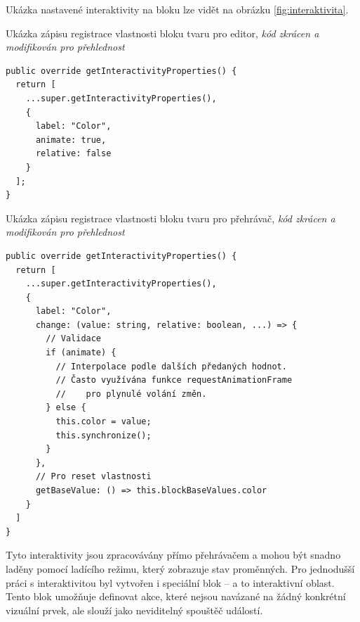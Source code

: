 Ukázka nastavené interaktivity na bloku lze vidět na obrázku \ref{fig:interaktivita}.

\begin{listing}[ht!]
\caption[Ukázka zápisu registrace vlastnosti bloku tvaru pro editor]{Ukázka zápisu registrace vlastnosti bloku tvaru pro editor, \textit{kód zkrácen a modifikován pro přehlednost}}\label{code:zapisVlastnostiEditor}
\begin{verbatim}
public override getInteractivityProperties() {
  return [
    ...super.getInteractivityProperties(),
    {
      label: "Color",
      animate: true,
      relative: false
    }
  ];
}
\end{verbatim}
\end{listing}



\begin{listing}[ht!]
\caption[Ukázka zápisu registrace vlastnosti bloku tvaru pro přehrávač]{Ukázka zápisu registrace vlastnosti bloku tvaru pro přehrávač, \textit{kód zkrácen a modifikován pro přehlednost}}\label{code:zapisVlastnostiPrehravac}
\begin{verbatim}
public override getInteractivityProperties() {
  return [
    ...super.getInteractivityProperties(),
    {
      label: "Color",
      change: (value: string, relative: boolean, ...) => {
        // Validace
        if (animate) {
          // Interpolace podle dalších předaných hodnot.
          // Často využívána funkce requestAnimationFrame
          //    pro plynulé volání změn.
        } else {
          this.color = value;
          this.synchronize();
        }
      },
      // Pro reset vlastnosti
      getBaseValue: () => this.blockBaseValues.color
    }
  ]
}
\end{verbatim}
\end{listing}

Tyto interaktivity jsou zpracovávány přímo přehrávačem a mohou být snadno laděny pomocí ladícího režimu, který zobrazuje stav proměnných. 
Pro jednodušší práci s interaktivitou byl vytvořen i speciální blok -- a to interaktivní oblast.
Tento blok umožňuje definovat akce, které nejsou navázané na žádný konkrétní vizuální prvek, ale slouží jako neviditelný spouštěč událostí.




